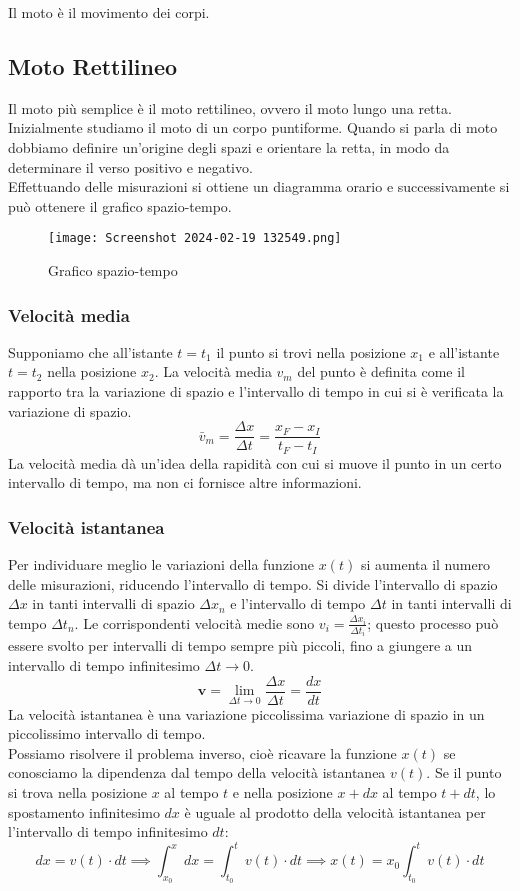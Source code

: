 \documentclass[../../main.tex]{subfiles}
\begin{document}
Il moto è il movimento dei corpi.
\subsection{Moto Rettilineo}
Il moto più semplice è il moto rettilineo, ovvero il moto lungo una retta. Inizialmente studiamo il moto di un corpo puntiforme.
Quando si parla di moto dobbiamo definire un'origine degli spazi e orientare la retta, in modo da determinare il verso positivo e
negativo.\\
Effettuando delle misurazioni si ottiene un diagramma orario e successivamente si può ottenere il grafico spazio-tempo.\\
\begin{figure}[h!]
    \centering
    \texttt{[image: Screenshot 2024-02-19 132549.png]}
    \caption{Grafico spazio-tempo}
\end{figure}
\subsubsection{Velocità media}
Supponiamo che all'istante $t = t_1$ il punto si trovi nella posizione $x_1$ e all'istante $t = t_2$ nella posizione $x_2$.
La velocità media $v_m$ del punto è definita come il rapporto tra la variazione di spazio e l'intervallo di tempo in cui si è verificata la variazione di spazio.
\[
    \textbf{$\bar{v}_m$} = \frac{\Delta x}{\Delta t} = \frac{x_F - x_I}{t_F - t_I}
\]
La velocità media dà un'idea della rapidità con cui si muove il punto in un certo intervallo di tempo, ma non ci fornisce altre informazioni.
\subsubsection{Velocità istantanea}
Per individuare meglio le variazioni della funzione $x(t)$ si aumenta il numero delle misurazioni, riducendo l'intervallo di tempo.
Si divide l'intervallo di spazio $\Delta x$ in tanti intervalli di spazio $\Delta x_n$ e l'intervallo di tempo $\Delta t$ in tanti intervalli di tempo $\Delta t_n$. Le corrispondenti velocità medie sono $v_i = \frac{\Delta x_i}{\Delta t_i}$; questo processo può essere svolto per intervalli di tempo sempre più piccoli, fino a giungere a un intervallo di tempo infinitesimo $\Delta t \to 0$.
\[
    \textbf{v} = \lim_{\Delta t \to 0} \frac{\Delta x}{\Delta t} = \frac{dx}{dt}
\]
La velocità istantanea è una variazione piccolissima variazione di spazio in un piccolissimo intervallo di tempo.\\
Possiamo risolvere il problema inverso, cioè ricavare la funzione $x(t)$ se conosciamo la dipendenza dal tempo della velocità istantanea $v(t)$. Se il punto si trova nella posizione $x$ al tempo $t$ e nella posizione $x + dx$ al tempo $t + dt$, lo spostamento infinitesimo $dx$ è uguale al prodotto della velocità istantanea per l'intervallo di tempo infinitesimo $dt$:
\[
    dx = v(t) \cdot dt \implies \int_{x_0}^{x} dx = \int_{t_0}^{t} v(t) \cdot dt \implies x(t) = x_0 \int_{t_0}^{t} v(t) \cdot dt
\]
\end{document}
